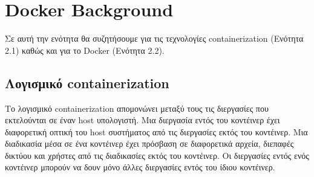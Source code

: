 \chapter{\textlatin{Docker Background}}
\label{dockerBackground}

Σε αυτή την ενότητα θα συζητήσουμε για τις τεχνολογίες
\textlatin{containerization} (Ενότητα 2.1) καθώς και για το
\textlatin{Docker} (Ενότητα 2.2).


\section{Λογισμικό \textlatin{containerization}}

Το λογισμικό \textlatin{containerization} απομονώνει μεταξύ τους τις διεργασίες
που εκτελούνται σε έναν \textlatin{host} υπολογιστή. Μια διεργασία εντός του
κοντέινερ έχει διαφορετική οπτική του \textlatin{host} συστήματος από τις
διεργασίες εκτός του κοντέινερ. Μια διαδικασία μέσα σε ένα κοντέινερ έχει
πρόσβαση σε διαφορετικά αρχεία, διεπαφές δικτύου και χρήστες από τις διαδικασίες
εκτός του κοντέινερ. Οι διεργασίες εντός ενός κοντέινερ μπορούν να δουν μόνο
άλλες διεργασίες εντός του ίδιου κοντέινερ.



